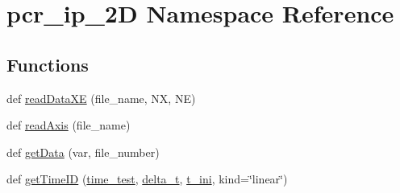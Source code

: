 \hypertarget{namespacepcr__ip__2D}{}\section{pcr\+\_\+ip\+\_\+2D Namespace Reference}
\label{namespacepcr__ip__2D}
\subsection*{Functions}
\begin{DoxyCompactItemize}
\item 
def \hyperlink{namespacepcr__ip__2D_afd03ca2199b0a8b0791f980475a7dbef}{read\+Data\+XE} (file\+\_\+name, NX, NE)
\item 
def \hyperlink{namespacepcr__ip__2D_a390f95786710e7e1249495452b874692}{read\+Axis} (file\+\_\+name)
\item 
def \hyperlink{namespacepcr__ip__2D_a265aa413c60e846683ff66d83ff2f1f0}{get\+Data} (var, file\+\_\+number)
\item 
def \hyperlink{namespacepcr__ip__2D_a5b61f4fcc6e641b5bb012f573b0495b3}{get\+Time\+ID} (\hyperlink{namespacepcr__ip__2D_a2f5bdb13fbded2c22c90cde6e8cc41e7}{time\+\_\+test}, \hyperlink{namespacepcr__ip__2D_a15848a5cc643f9e16f7c40d29f7540df}{delta\+\_\+t}, \hyperlink{namespacepcr__ip__2D_a335b9e411d312c5928c1db82c0cf64cb}{t\+\_\+ini}, kind=\char`\"{}linear\char`\"{})
\end{DoxyCompactItemize}
